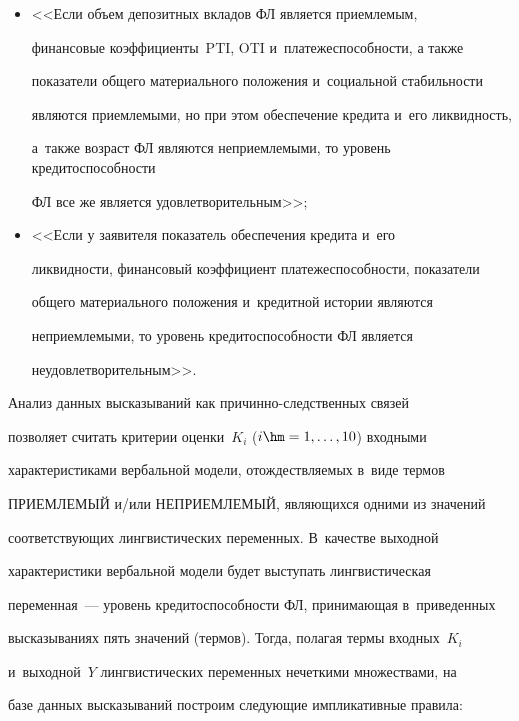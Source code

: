 \begin{itemize}
ФЛ, то уровень кредитоспособности ФЛ является очень 

удовлетворительным>>; 

  

\item[$e_5$:] <<Если объем депозитных вкладов ФЛ является приемлемым, 

финансовые коэффициенты~PTI, OTI и~платежеспособности, а также 

показатели общего материального положения и~социальной стабильности 

являются приемлемыми, но при этом обеспечение кредита и~его ликвидность, 

а~также возраст ФЛ являются неприемлемыми, то уровень кре\-ди\-то\-спо\-соб\-ности 

ФЛ все же является удовлетворительным>>; 

  

\item[$e_6$:] <<Если у заявителя показатель обеспечения кредита и~его 

ликвидности, финансовый коэффициент платежеспособности, показатели 

общего материального положения и~кредитной истории являются 

неприемлемыми, то уровень кредитоспособности ФЛ является 

неудовлетворительным>>. 

\end{itemize}

  

  Анализ данных высказываний как при\-чин\-но-след\-ст\-вен\-ных связей 

позволяет считать критерии оценки~$K_i$ ($i\hm= 1, \ldots ,10$) входными 

характеристиками вербальной модели, отождествляемых в~виде термов 

ПРИЕМЛЕМЫЙ и\!/\!или НЕПРИЕМЛЕМЫЙ, являющихся одними из значений 

соответствующих лингвистических переменных. В~качестве выходной 

характеристики вербальной модели будет выступать лингвистическая 

переменная~--- уровень кредитоспособности ФЛ, принимающая в~приведенных 

высказываниях пять значений (термов). Тогда, полагая термы входных~$K_i$ 

и~выходной~$Y$ лингвистических переменных нечеткими множествами, на 

базе данных высказываний построим следующие импликативные правила: 

